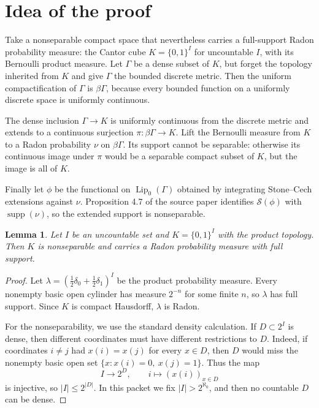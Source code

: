 \documentclass[11pt]{article}
\newtheorem{lemma}{Lemma}
\DeclareMathOperator{\Lip}{Lip}
\DeclareMathOperator{\supp}{supp}
\newcommand{\SM}{\mathcal S}
\begin{document}
\section*{Idea of the proof}

Take a nonseparable compact space that nevertheless carries a full-support
Radon probability measure: the Cantor cube \(K=\{0,1\}^I\) for uncountable
\(I\), with its Bernoulli product measure.  Let \(\Gamma\) be a dense subset of
\(K\), but forget the topology inherited from \(K\) and give \(\Gamma\) the
bounded discrete metric.  Then the uniform compactification of \(\Gamma\) is
\(\beta\Gamma\), because every bounded function on a uniformly discrete space
is uniformly continuous.

The dense inclusion \(\Gamma\to K\) is uniformly continuous from the discrete
metric and extends to a continuous surjection
\(\pi:\beta\Gamma\to K\).  Lift the Bernoulli measure from \(K\) to a Radon
probability \(\nu\) on \(\beta\Gamma\).  Its support cannot be separable:
otherwise its continuous image under \(\pi\) would be a separable compact
subset of \(K\), but the image is all of \(K\).

Finally let \(\phi\) be the functional on \(\Lip_0(\Gamma)\) obtained by
integrating Stone--Cech extensions against \(\nu\).  Proposition 4.7 of the
source paper identifies \(\SM(\phi)\) with \(\supp(\nu)\), so the extended
support is nonseparable.

\begin{lemma}\label{lem:cube}
Let \(I\) be an uncountable set and \(K=\{0,1\}^I\) with the product topology.
Then \(K\) is nonseparable and carries a Radon probability measure with full
support.
\end{lemma}

\begin{proof}
Let \(\lambda=(\frac12\delta_0+\frac12\delta_1)^I\) be the product probability
measure.  Every nonempty basic open cylinder has measure \(2^{-n}\) for some
finite \(n\), so \(\lambda\) has full support.  Since \(K\) is compact
Hausdorff, \(\lambda\) is Radon.

For the nonseparability, we use the standard density calculation.  If
\(D\subset 2^I\) is dense, then different coordinates must have different
restrictions to \(D\).  Indeed, if coordinates \(i\ne j\) had
\(x(i)=x(j)\) for every \(x\in D\), then \(D\) would miss the nonempty basic
open set \(\{x:x(i)=0,\ x(j)=1\}\).  Thus the map
\[
        I\longrightarrow 2^D,\qquad i\longmapsto (x(i))_{x\in D}
\]
is injective, so \(|I|\leq 2^{|D|}\).  In this packet we fix
\(|I|>2^{\aleph_0}\), and then no countable \(D\) can be dense.
\end{proof}
\end{document}

